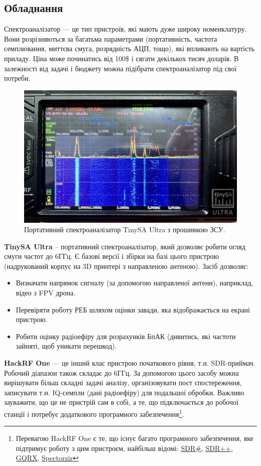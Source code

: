 \documentclass{article}
\begin{document}
\subsection{Обладнання}

Спектроаналізатор --- це тип пристроїв, які мають дуже широку номенклатуру. Вони розрізняються за багатьма параметрами (портативність, частота семплювання, миттєва смуга, розрядність АЦП, тощо), які впливають на вартість приладу. Ціна може починатись від 100\$ і сягати декількох тисяч доларів. В залежності від задачі і бюджету можна підібрати спектроаналізатор під свої потреби.

\begin{figure}[H]
\centering
\includegraphics[width=0.7\linewidth]{images/tinysa.jpg}
\caption{\label{fig:tinysa}Портативний спектроаналізатор TinySA Ultra з прошивкою ЗСУ.}
\end{figure}

\textbf{TinySA Ultra} -- портативний спектроаналізатор, який дозволяє робити огляд смуги частот до 6ГГц. Є базові версії і збірки на базі цього пристрою (надрукований корпус на 3D принтері з направленою антеною). Засіб дозволяє:

\begin{itemize}[noitemsep, topsep=8pt]
\item Визначати напрямок сигналу (за допомогою направленої антени), наприклад, відео з FPV дрона.
\item Перевіряти роботу РЕБ шляхом оцінки завади, яка відображається на екрані пристрою.
\item Робити оцінку радіоефіру для розрахунків БпАК (дивитись, які частоти зайняті, щоб уникати перешкод).
\end{itemize}


\textbf{HackRF One} --- це інший клас пристрою початкового рівня, т.н. SDR-приймач. Робочий діапазон також складає до 6ГГц. За допомогою цього засобу можна вирішувати більш складні задачі аналізу, організовувати пост спостереження, записувати т.н. IQ-семпли (дані радіоефіру) для подальшої обробки. Важливо зауважити, що це не пристрій сам в собі, а те, що підключається до робочої станції і потребує додаткового програмного забезпечення\footnote{Перевагою HackRF One є те, що існує багато програмного забезпечення, яке підтримує роботу з цим пристроєм, найбільш відомі: \href{https://airspy.com/download/}{SDR\#}, \href{https://www.sdrpp.org/}{SDR++}, \href{https://www.gqrx.dk/}{GQRX}, \href{https://spectrozir.com/}{Spectorzir}}.
\end{document}
